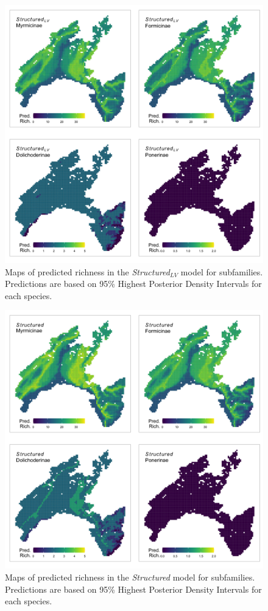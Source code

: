 \documentclass[preprint,review,times,12pt]{elsarticle}
\begin{document}
\begin{figure}
	\centering\includegraphics[width=5in]{ms/1_Ecography/1/figs/maps/sf_S_S+LV.png}
	\caption{\label{fig:sf_map_Structured+LV} Maps of predicted richness in the \emph{Structured}$_{LV}$ model for subfamilies. Predictions are based on 95\% Highest Posterior Density Intervals for each species. }
\end{figure}

\begin{figure}
	\centering\includegraphics[width=5in]{ms/1_Ecography/1/figs/maps/sf_S_S.png}
	\caption{\label{fig:sf_map_Structured} Maps of predicted richness in the \emph{Structured} model for subfamilies. Predictions are based on 95\% Highest Posterior Density Intervals for each species. }
\end{figure}
\end{document}
